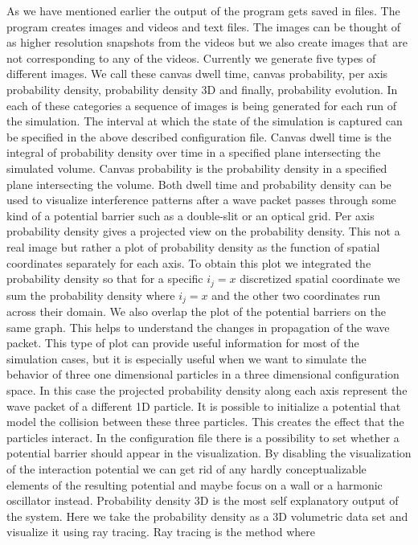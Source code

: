 As we have mentioned earlier the output of the program gets saved in files.
The program creates images and videos and text files.
The images can be thought of as higher resolution snapshots from the videos but we also create images that are not corresponding to any of the videos.
Currently we generate five types of different images.
We call these canvas dwell time, canvas probability, per axis probability density, probability density 3D and finally, probability evolution.
In each of these categories a sequence of images is being generated for each run of the simulation.
The interval at which the state of the simulation is captured can be specified in the above described configuration file.
Canvas dwell time is the integral of probability density over time in a specified plane intersecting the simulated volume.
Canvas probability is the probability density in a specified plane intersecting the volume.
Both dwell time and probability density can be used to visualize interference patterns after a wave packet passes through some kind of a potential barrier such as a double-slit or an optical grid.
Per axis probability density gives a projected view on the probability density.
This not a real image but rather a plot of probability density as the function of spatial coordinates separately for each axis.
To obtain this plot we integrated the probability density so that for a specific $i_j = x$ discretized spatial coordinate we sum the probability density where $i_j = x$ and the other two coordinates run across their domain.
We also overlap the plot of the potential barriers on the same graph.
This helps to understand the changes in propagation of the wave packet.
This type of plot can provide useful information for most of the simulation cases, but it is especially useful when we want to simulate the behavior of three one dimensional particles in a three dimensional configuration space.
In this case the projected probability density along each axis represent the wave packet of a different 1D particle.
It is possible to initialize a potential that model the collision between these three particles.
This creates the effect that the particles interact.
In the configuration file there is a possibility to set whether a potential barrier should appear in the visualization.
By disabling the visualization of the interaction potential we can get rid of any hardly conceptualizable elements of the resulting potential and maybe focus on a wall or a harmonic oscillator instead.
Probability density 3D is the most self explanatory output of the system.
Here we take the probability density as a 3D volumetric data set and visualize it using ray tracing.
Ray tracing is the method where 



